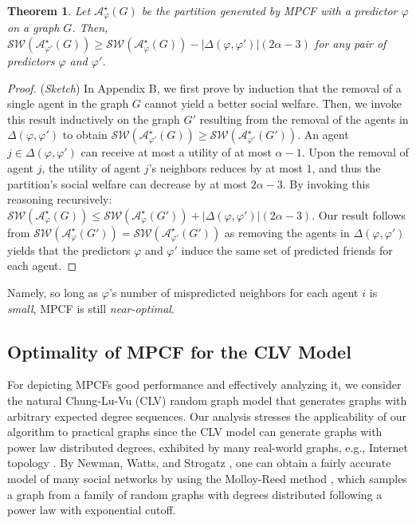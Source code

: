 \documentclass[letterpaper]{article}
\newtheorem{theorem}{Theorem}
\begin{document}
\begin{theorem}
\label{thm:noisy}
Let $\mathcal{A}^\star_{\varphi}(G)$ be the partition generated by MPCF with a predictor $\varphi$ on a graph $G$. Then, $\mathcal{SW}(\mathcal{A}^\star_{\varphi'}(G)) \geq \mathcal{SW}(\mathcal{A}^\star_{\varphi}(G)) - |\Delta(\varphi,\varphi')|(2\alpha-3)$ for any pair of predictors $\varphi$ and $\varphi'$.
\end{theorem}
\begin{proof}
(\textit{Sketch})
In Appendix B, we first prove by induction that the removal of a single agent in the graph $G$ cannot yield a better social welfare. Then, we invoke this result inductively on the graph $G'$ resulting from the removal of the agents in $\Delta(\varphi,\varphi')$ to obtain $\mathcal{SW}(\mathcal{A}^\star_{\varphi'}(G)) \geq \mathcal{SW}(\mathcal{A}^\star_{\varphi'}(G'))$. An agent $j \in \Delta(\varphi,\varphi')$ can receive at most a utility of at most $\alpha-1$. Upon the removal of agent $j$, the utility of agent $j$'s neighbors reduces by at most $1$, and thus the partition's social welfare can decrease by at most $2\alpha - 3$. By invoking this reasoning recursively: $\mathcal{SW}(\mathcal{A}^\star_{\varphi}(G)) \leq \mathcal{SW}(\mathcal{A}^\star_{\varphi}(G')) + |\Delta(\varphi,\varphi')|(2\alpha-3)$. Our result follows from $\mathcal{SW}(\mathcal{A}^\star_{\varphi}(G')) = \mathcal{SW}(\mathcal{A}^\star_{\varphi'}(G'))$ as removing the agents in $\Delta(\varphi,\varphi')$ yields that the predictors $\varphi$ and $\varphi'$ induce the same set of predicted friends for each agent.
\end{proof}

Namely, so long as $\varphi$'s number of mispredicted neighbors for each agent $i$ is \textit{small}, MPCF is still \textit{near-optimal}.



\subsection{Optimality of MPCF for the CLV Model}
\label{sec:Optimality of MPCF for the CLV Model}
For depicting MPCFs good performance and effectively analyzing it, we consider the natural Chung-Lu-Vu (CLV) random graph model \cite{chung2004spectra} that generates graphs with arbitrary expected degree sequences. Our analysis stresses the applicability of our algorithm to practical graphs since the CLV model can generate graphs with power law distributed degrees, exhibited by many real-world graphs, e.g., Internet topology \cite{chung2004spectra}. By Newman, Watts, and Strogatz , one can obtain a fairly accurate model of many social networks by using the Molloy-Reed method \cite{molloy1995critical}, which samples a graph from a family of random graphs with degrees distributed following a power law with exponential cutoff.
\end{document}
